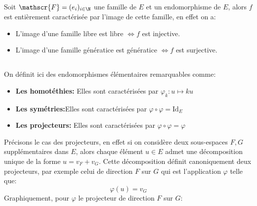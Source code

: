 \subsection*{}

Soit \(\mathscr{F} = (e_i)_{i \in \N}\) une famille de \(E\) et un endomorphisme de \(E\), alors \(f\) est entièrement caractérisée par l'image de cette famille, en effet on a:
\begin{itemize}
   \item L'image d'une famille libre est libre \(\Longleftrightarrow f\) est injective.
   \item L'image d'une famille génératice est génératice \(\Longleftrightarrow f\) est surjective.      
\end{itemize}
\subsection*{}
On définit ici des endomorphismes élémentaires remarquables comme:
\begin{itemize}
   \item \textbf{Les homotéthies:} Elles sont caractérisées par \(\varphi_k : u \longmapsto ku\)
   \item \textbf{Les symétries:}Elles sont caractérisées par \(\varphi \circ \varphi = \text{Id}_E\)
   \item \textbf{Les projecteurs:} Elles sont caractérisées par \(\varphi \circ \varphi = \varphi\)
\end{itemize}
Précisons le cas des projecteurs, en effet si on considère deux sous-espaces \(F, G\) supplémentaires dans \(E\), alors chaque élément \(u \in E\) admet une décomposition unique de la forme \(u = v_F + v_G\). Cette décomposition définit canoniquement deux projecteurs, par exemple celui de direction \(F\) sur \(G\) qui est l'application \(\varphi\) telle que:
\[
   \varphi(u) = v_G
\]
Graphiquement, pour \(\varphi\) le projecteur de direction \(F\) sur \(G\):
\begin{center}
\end{center}
